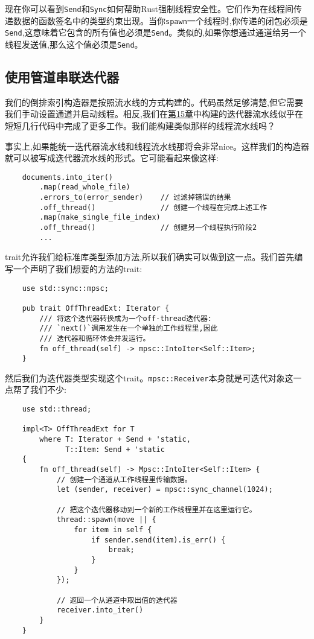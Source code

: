 现在你可以看到\texttt{Send}和\texttt{Sync}如何帮助Rust强制线程安全性。它们作为在线程间传递数据的函数签名中的类型约束出现。当你\texttt{spawn}一个线程时,你传递的闭包必须是\texttt{Send},这意味着它包含的所有值也必须是\texttt{Send}。类似的,如果你想通过通道给另一个线程发送值,那么这个值必须是\texttt{Send}。

\subsection{使用管道串联迭代器}
我们的倒排索引构造器是按照流水线的方式构建的。代码虽然足够清楚,但它需要我们手动设置通道并启动线程。相反,我们在\hyperref[ch15]{第15章}中构建的迭代器流水线似乎在短短几行代码中完成了更多工作。我们能构建类似那样的线程流水线吗？

事实上,如果能统一迭代器流水线和线程流水线那将会非常nice。这样我们的构造器就可以被写成迭代器流水线的形式。它可能看起来像这样:
\begin{verbatim}
    documents.into_iter()
        .map(read_whole_file)
        .errors_to(error_sender)    // 过滤掉错误的结果
        .off_thread()               // 创建一个线程在完成上述工作
        .map(make_single_file_index)
        .off_thread()               // 创建另一个线程执行阶段2
        ...
\end{verbatim}

trait允许我们给标准库类型添加方法,所以我们确实可以做到这一点。我们首先编写一个声明了我们想要的方法的trait:
\begin{verbatim}
    use std::sync::mpsc;

    pub trait OffThreadExt: Iterator {
        /// 将这个迭代器转换成为一个off-thread迭代器:
        /// `next()`调用发生在一个单独的工作线程里,因此
        /// 迭代器和循环体会并发运行。
        fn off_thread(self) -> mpsc::IntoIter<Self::Item>;
    }
\end{verbatim}

然后我们为迭代器类型实现这个trait。\texttt{mpsc::Receiver}本身就是可迭代对象这一点帮了我们不少:
\begin{verbatim}
    use std::thread;

    impl<T> OffThreadExt for T
        where T: Iterator + Send + 'static,
              T::Item: Send + 'static
    {
        fn off_thread(self) -> Mpsc::IntoIter<Self::Item> {
            // 创建一个通道从工作线程里传输数据。
            let (sender, receiver) = mpsc::sync_channel(1024);

            // 把这个迭代器移动到一个新的工作线程里并在这里运行它。
            thread::spawn(move || {
                for item in self {
                    if sender.send(item).is_err() {
                        break;
                    }
                }
            });

            // 返回一个从通道中取出值的迭代器
            receiver.into_iter()
        }
    }
\end{verbatim}

